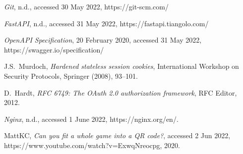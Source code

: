 \documentclass[11pt, a4paper]{report}
\begin{document}
\begin{thebibliography}{99}
\emph{Git}, n.d., accessed 30 May 2022,
https://git-scm.com/

\emph{FastAPI}, n.d., accessed 31 May 2022,
https://fastapi.tiangolo.com/

\emph{OpenAPI Specification}, 20 February 2020, accessed 31 May 2022,
https://swagger.io/specification/

J.S.~Murdoch,
\emph{Hardened stateless session cookies},
International Workshop on Security Protocols, Springer (2008),  93--101.

D.~Hardt,
\emph{RFC 6749: The OAuth 2.0 authorization framework}, RFC Editor, 2012.

\emph{Nginx}, n.d., accessed 1 June 2022, 
https://nginx.org/en/.

MattKC, \emph{Can you fit a whole game into a QR code?}, accessed 2 Jun 2022, https://www.youtube.com/watch?v=ExwqNreocpg, 2020.

\end{thebibliography}
\end{document}
